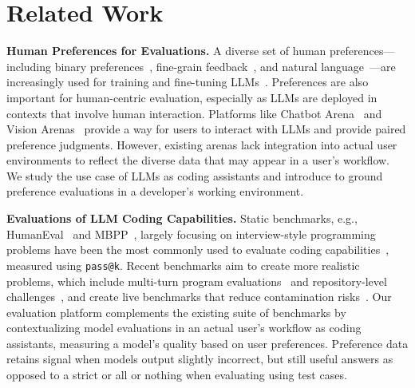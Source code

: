 

\section{Related Work}\label{sec:related}


\textbf{Human Preferences for Evaluations.} 
A diverse set of human preferences---including binary preferences~\citep{bai2022training}, fine-grain feedback~\citep{wu2023fine, kirk2024the}, and natural language~\citep{scheurer2022training}---are increasingly used for training and fine-tuning LLMs~\citep{ouyang2022training}.
Preferences are also important for human-centric evaluation, especially as LLMs are deployed in contexts that involve human interaction.
Platforms like Chatbot Arena~\citep{chiang2024chatbot} and Vision Arenas~\citep{chou2024visionarena,lu2024wildvision} provide a way for users to interact with LLMs and provide paired preference judgments.
However, existing arenas lack integration into actual user environments to reflect the diverse data that may appear in a user's workflow.
We study the use case of LLMs as coding assistants and introduce \systemName to ground preference evaluations in a developer's working environment.



\textbf{Evaluations of LLM Coding Capabilities.} Static benchmarks, e.g., HumanEval~\citep{chen2021evaluating} and MBPP~\citep{austin2021program}, largely focusing on interview-style programming problems have been the most commonly used to evaluate coding capabilities~\citep{lu2021codexglue, nijkamp2022codegen,zhu2022xlcost, wang2022recode, liu2023your, jimenez2023swe, khan2023xcodeeval,yan2023codescope, cassano2023multipl, muennighoff2023octopack, dinh2023large,yang2023intercode}, measured using \texttt{pass@k}. 
Recent benchmarks aim to create more realistic problems, which include multi-turn program evaluations~\citep{nijkamp2022codegen} and repository-level challenges~\citep{jimenez2023swe,jain2024r2e}, and create live benchmarks that reduce contamination risks~\citep{jain2024livecodebench,white2024livebench}.
Our evaluation platform complements the existing suite of benchmarks by contextualizing model evaluations in an actual user's workflow as coding assistants, measuring a model's quality based on user preferences.
Preference data retains signal when models output slightly incorrect, but still useful answers as opposed to a strict or all or nothing when evaluating using test cases.



